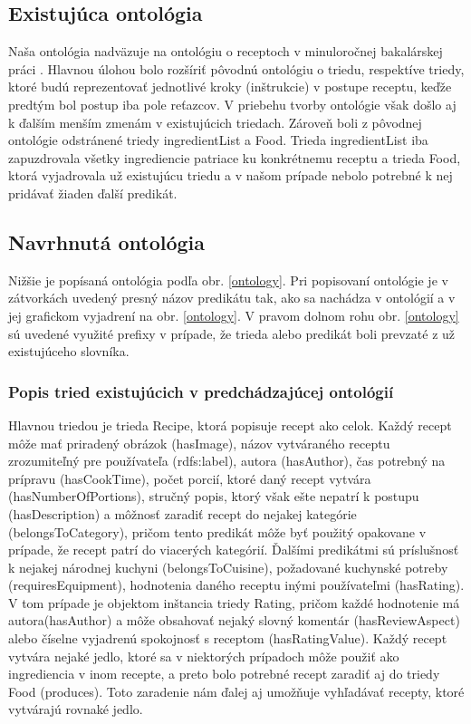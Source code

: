 \subsection{Existujúca ontológia}
	Naša ontológia nadväzuje na ontológiu o receptoch v minuloročnej bakalárskej práci \cite{bakalarka}. Hlavnou úlohou bolo rozšíriť pôvodnú ontológiu o triedu, respektíve triedy, ktoré budú reprezentovať jednotlivé kroky (inštrukcie) v postupe receptu, keďže predtým bol postup iba pole reťazcov. V priebehu tvorby ontológie však došlo aj k ďalším menším zmenám v existujúcich triedach. Zároveň boli z pôvodnej ontológie odstránené triedy ingredientList a Food. Trieda ingredientList iba zapuzdrovala všetky ingrediencie patriace ku konkrétnemu receptu a trieda Food, ktorá vyjadrovala už existujúcu triedu a v našom prípade nebolo potrebné k nej pridávať žiaden ďalší predikát.
	
\subsection{Navrhnutá ontológia} \label{secOntologia}
Nižšie je popísaná ontológia podľa obr. \ref{ontology}. Pri popisovaní ontológie je v zátvorkách uvedený presný názov predikátu tak, ako sa nachádza v ontológií a v jej grafickom vyjadrení na obr. \ref{ontology}. V pravom dolnom rohu obr. \ref{ontology} sú uvedené využité prefixy v prípade, že trieda alebo predikát boli prevzaté z už existujúceho slovníka. 
	
\subsubsection{Popis tried existujúcich v predchádzajúcej ontológií}
	Hlavnou triedou je trieda Recipe, ktorá popisuje recept ako celok. Každý recept môže mať priradený obrázok (hasImage), názov vytváraného receptu zrozumiteľný pre používateľa (rdfs:label), autora (hasAuthor), čas potrebný na prípravu (hasCookTime), počet porcií, ktoré daný recept vytvára (hasNumberOfPortions), stručný popis, ktorý však ešte nepatrí k postupu (hasDescription) a môžnosť zaradiť recept do nejakej kategórie (belongsToCategory), pričom tento predikát môže byť použitý opakovane v prípade, že recept patrí do viacerých kategórií. Ďalšími predikátmi sú príslušnosť k nejakej národnej kuchyni (belongsToCuisine), požadované kuchynské potreby (requiresEquipment), hodnotenia daného receptu inými používateľmi (hasRating). V tom prípade je objektom inštancia triedy Rating, pričom každé hodnotenie má autora(hasAuthor) a môže obsahovať nejaký slovný komentár (hasReviewAspect) alebo číselne vyjadrenú spokojnosť s receptom (hasRatingValue). Každý recept vytvára nejaké jedlo, ktoré sa v niektorých prípadoch môže použiť ako ingrediencia v inom recepte, a preto bolo potrebné recept zaradiť aj do triedy Food (produces). Toto zaradenie nám ďalej aj umožňuje vyhľadávať recepty, ktoré vytvárajú rovnaké jedlo.
	
